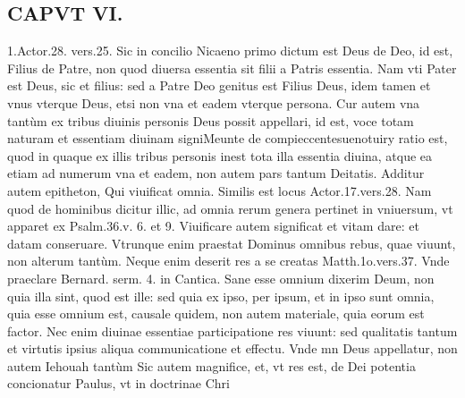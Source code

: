 \documentclass{article}
\begin{document}
\begin{pages}
\section*{CAPVT  VI. }
\marginpar{[ p.469 ]}\pstart 1.Actor.28. vers.25. Sic in concilio Nicaeno primo dictum est Deus de Deo, id est, Filius de Patre, non quod diuersa essentia sit filii a Patris essentia. Nam vti Pater est Deus, sic et filius: sed a Patre Deo genitus est Filius Deus, idem tamen et vnus vterque Deus, etsi non vna et eadem vterque persona. Cur autem vna tantùm ex tribus diuinis personis Deus possit appellari, id est, voce totam naturam et essentiam diuinam signiMeunte de compieccentesuenotuiry ratio est, quod in quaque ex illis tribus personis inest tota illa essentia diuina, atque ea etiam ad numerum vna et eadem, non autem pars tantum Deitatis.  \pend\pstart Additur autem epitheton, Qui viuificat omnia. Similis est locus Actor.17.vers.28. Nam quod de hominibus dicitur illic, ad omnia rerum genera pertinet in vniuersum, vt apparet ex Psalm.36.v. 6. et 9. Viuificare autem significat et vitam dare: et datam conseruare. Vtrunque enim praestat Dominus omnibus rebus, quae viuunt, non alterum tantùm. Neque enim deserit res a se creatas Matth.1o.vers.37. Vnde praeclare Bernard. serm. 4. in Cantica. Sane esse omnium dixerim Deum, non quia illa sint, quod est ille: sed quia ex ipso, per ipsum, et in ipso sunt omnia, quia esse omnium est, causale quidem, non autem materiale, quia eorum est factor. Nec enim diuinae essentiae participatione res viuunt: sed qualitatis tantum et virtutis ipsius aliqua communicatione et effectu. Vnde mn Deus appellatur, non autem Iehouah tantùm  \pend\pstart Sic autem magnifice, et, vt res est, de Dei potentia concionatur Paulus, vt in doctrinae Chri\pend

\end{pages}
\end{document}
